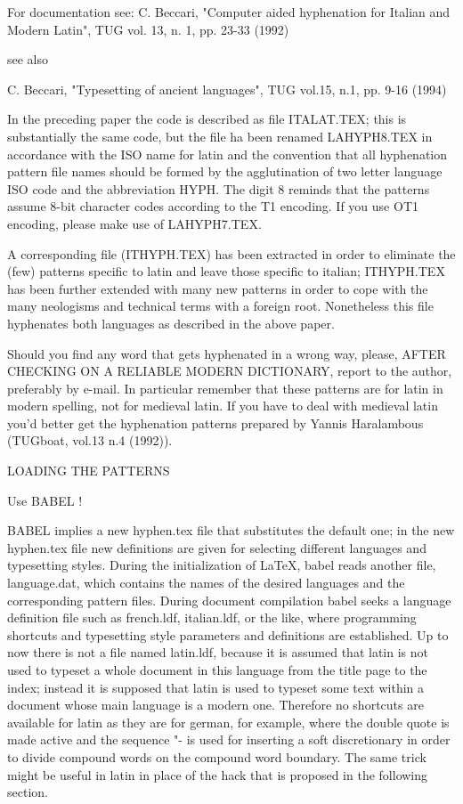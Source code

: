  For documentation see:
 C. Beccari, "Computer aided hyphenation for Italian and Modern
       Latin", TUG vol. 13, n. 1, pp. 23-33 (1992)

 see also

 C. Beccari, "Typesetting of ancient languages",
             TUG vol.15, n.1, pp. 9-16 (1994)

 In the preceding paper the code is described as file ITALAT.TEX; this is
 substantially the same code, but the file ha been renamed LAHYPH8.TEX
 in accordance with the ISO name for latin and the convention that all
 hyphenation pattern file names should be formed by the agglutination of
 two letter language ISO code and the abbreviation HYPH. The digit 8
 reminds that the patterns assume 8-bit character codes according to the
 T1 encoding. If you use OT1 encoding, please make use of LAHYPH7.TEX.

 A corresponding file (ITHYPH.TEX) has been extracted in order to eliminate
 the (few) patterns specific to latin and leave those specific to italian;
 ITHYPH.TEX has been further extended with many new patterns in order to
 cope with the many neologisms and technical terms with a foreign root.
 Nonetheless this file hyphenates both languages as described in the above
 paper.

 Should you find any word that gets hyphenated in a wrong way, please, AFTER
 CHECKING ON A RELIABLE MODERN DICTIONARY, report to the author, preferably
 by e-mail. In particular remember that these patterns are for latin in
 modern spelling, not for medieval latin. If you have to deal with medieval
 latin you'd better get the hyphenation patterns prepared by Yannis
 Haralambous (TUGboat, vol.13 n.4 (1992)).

 LOADING THE PATTERNS

 Use BABEL !

 BABEL implies a new hyphen.tex file that substitutes the default one; in
 the new hyphen.tex file new definitions are given for selecting different
 languages and typesetting styles. During the initialization of LaTeX,
 babel reads another  file, language.dat, which contains the names of
 the desired languages and the corresponding pattern files. During
 document compilation babel seeks a language definition file such as
 french.ldf, italian.ldf, or the like, where programming shortcuts and
 typesetting style parameters and definitions are established. Up to now
 there is not a file named latin.ldf, because it is assumed that latin
 is not used to typeset a whole document in this language from the title
 page to the index; instead it is supposed that latin is used to typeset
 some text within a document whose main language is a modern one.
 Therefore no shortcuts are available for latin as they are for german,
 for example, where the double quote is made active and the sequence "- is
 used for inserting a soft discretionary in order to divide compound words
 on the compound word boundary. The same trick might be useful in latin in
 place of the hack that is proposed in the following section.

